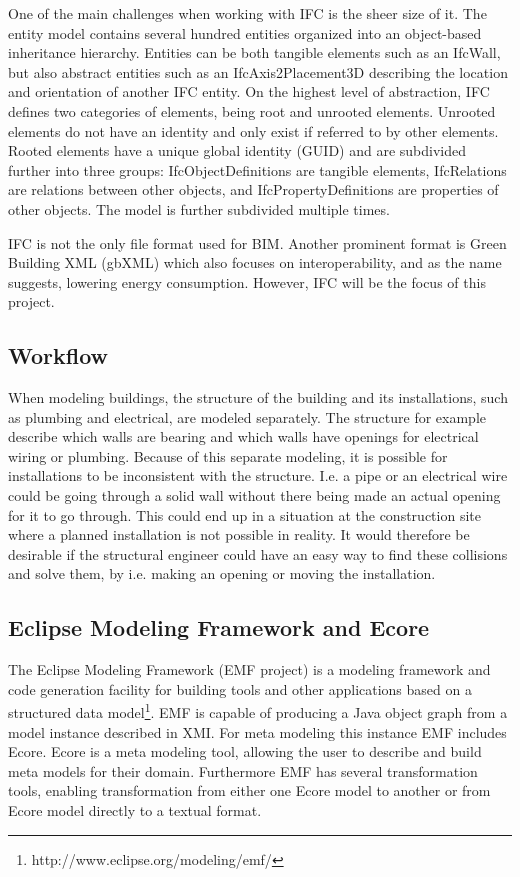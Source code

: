 One of the main challenges when working with IFC is the sheer size of it. The entity model contains several hundred entities organized into an object-based inheritance hierarchy. Entities can be both tangible elements such as an IfcWall, but also abstract entities such as an IfcAxis2Placement3D describing the location and orientation of another IFC entity. On the highest level of abstraction, IFC defines two categories of elements, being root and unrooted elements. Unrooted elements do not have an identity and only exist if referred to by other elements. Rooted elements have a unique global identity (GUID) and are subdivided further into three groups: IfcObjectDefinitions are tangible elements, IfcRelations are relations between other objects, and IfcPropertyDefinitions are properties of other objects. The model is further subdivided multiple times. 

IFC is not the only file format used for BIM. Another prominent format is Green Building XML (gbXML) which also focuses on interoperability, and as the name suggests, lowering energy consumption. However, IFC will be the focus of this project.
\subsection{Workflow}
When modeling buildings, the structure of the building and its installations, such as plumbing and electrical, are modeled separately. The structure for example describe which walls are bearing and which walls have openings for electrical wiring or plumbing.  Because of this separate modeling, it is possible for installations to be inconsistent with the structure. I.e. a pipe or an electrical wire could be going through a solid wall without there being made an actual opening for it to go through. This could end up in a situation at the construction site where a planned installation is not possible in reality. It would therefore be desirable if the structural engineer could have an easy way to find these collisions and solve them, by i.e. making an opening or moving the installation.
\subsection{Eclipse Modeling Framework and Ecore}
The Eclipse Modeling Framework (EMF project) is a modeling framework and code generation facility for building tools and other applications based on a structured data model\footnote{http://www.eclipse.org/modeling/emf/}. EMF is capable of producing a Java object graph from a model instance described in XMI. For meta modeling this instance EMF includes Ecore. Ecore is a meta modeling tool, allowing the user to describe and build meta models for their domain. Furthermore EMF has several transformation tools, enabling transformation from either one Ecore model to another or from Ecore model directly to a textual format.